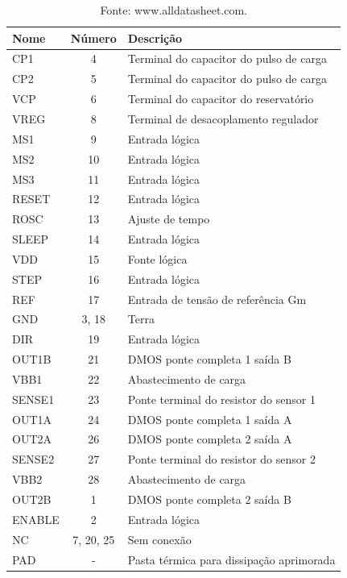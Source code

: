 \begin{table}[H]
    \footnotesize
    \centering
    \caption{Lista de terminais do driver A4988.}
    \begin{tabular}{lcl}
        \hline
        \textbf{Nome} & \textbf{Número} & \textbf{Descrição}\\
        \hline
         CP1 & 4 & Terminal do capacitor do pulso de carga\\
         CP2 & 5 & Terminal do capacitor do pulso de carga\\
         VCP & 6 & Terminal do capacitor do reservatório\\
         VREG & 8 & Terminal de desacoplamento regulador\\
         MS1 & 9 & Entrada lógica\\
         MS2 & 10 & Entrada lógica\\
         MS3 & 11 & Entrada lógica\\
         RESET & 12 & Entrada lógica\\
         ROSC & 13 & Ajuste de tempo\\
         SLEEP & 14 & Entrada lógica\\
         VDD & 15 & Fonte lógica\\
         STEP & 16 & Entrada lógica\\
         REF & 17 & Entrada de tensão de referência Gm\\
         GND & 3, 18 & Terra\\
         DIR & 19 & Entrada lógica\\
         OUT1B & 21 & DMOS ponte completa 1 saída B\\
         VBB1 & 22 & Abastecimento de carga\\
         SENSE1 & 23 & Ponte terminal do resistor do sensor 1\\
         OUT1A & 24 & DMOS ponte completa 1 saída A\\
         OUT2A & 26 & DMOS ponte completa 2 saída A\\
         SENSE2 & 27 & Ponte terminal do resistor do sensor 2\\
         VBB2 & 28 & Abastecimento de carga\\
         OUT2B & 1 & DMOS ponte completa 2 saída B\\
         ENABLE & 2 & Entrada lógica\\
         NC & 7, 20, 25 & Sem conexão\\
         PAD & - & Pasta térmica para dissipação aprimorada\\
        \hline       
    \end{tabular}
    \caption*{Fonte: www.alldatasheet.com.}
    \label{tab:pdriverportas}
\end{table}


